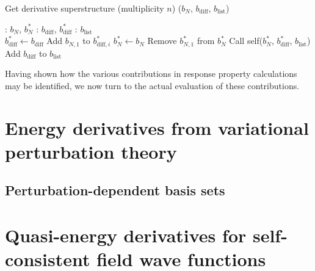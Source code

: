 \documentclass[%
 reprint,
 amsmath,amssymb,
 aps,
]{revtex4-1}
\begin{document}

\begin{algorithm}
\caption{Get derivative superstructure (multiplicity $n$) ($b_{N}$, $b_{\text{diff}}$, $b_{\text{list}}$)}
\label{GET-DS}
\begin{algorithmic}
: $b_{N}$, $b_{N}^{*}$
: $b_{\text{diff}}$, $b_{\text{diff}}^{*}$
: $b_{\text{list}}$\\

         \State $b_{\text{diff}}^{*} \gets b_{\text{diff}}$
         \State Add $b_{N, 1}$ to $b_{\text{diff}, i}^{*}$
         \State $b_{N}^{*} \gets b_{N}$
         \State Remove $b_{N, 1}^{*}$ from $b_{N}^{*}$ 
         \State Call self($b_{N}^{*}$, $b_{\text{diff}}^{*}$, $b_{\text{list}}$) %
      \EndFor
   \Else
            \State Add $b_{\text{diff}}$ to $b_{\text{list}}$
         \EndIf
      \EndIf
   \EndIf
\end{algorithmic}
\end{algorithm}

Having shown how the various contributions in response property calculations may be identified, we now turn to the actual evaluation of these contributions. 

\section{\label{sec:VPT}Energy derivatives from variational perturbation theory}

\subsection{\label{sec:PDBS}Perturbation-dependent basis sets}

\section{\label{sec:QE-derivatives}Quasi-energy derivatives for self-consistent field wave functions}
\end{document}
